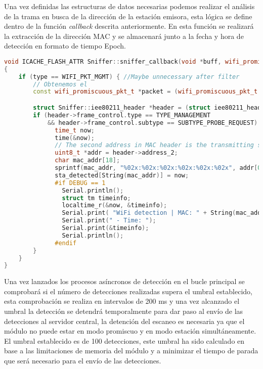 \documentclass[../proyecto.tex]{subfiles}
\begin{document}
Una vez definidas las estructuras de datos necesarias podemos realizar el análisis de la trama en busca de la dirección de la estación emisora, esta lógica se define dentro de la función \textit{callback} descrita anteriormente. En esta función se realizará la extracción de la dirección MAC y se almacenará junto a la fecha y hora de detección en formato de tiempo Epoch.\\

\begin{minipage}{\linewidth}
\begin{lstlisting}[language=C++, caption=Función \textit{callback} para el modo promiscuo , captionpos=b, frame=single]
void ICACHE_FLASH_ATTR Sniffer::sniffer_callback(void *buff, wifi_promiscuous_pkt_type_t type)
{
    if (type == WIFI_PKT_MGMT) { //Maybe unnecessary after filter
        // Obtenemos el
        const wifi_promiscuous_pkt_t *packet = (wifi_promiscuous_pkt_t *)buff;

        struct Sniffer::iee80211_header *header = (struct iee80211_header*) packet->payload;
        if (header->frame_control.type == TYPE_MANAGEMENT
            && header->frame_control.subtype == SUBTYPE_PROBE_REQUEST) {
              time_t now;
              time(&now);
              // The second address in MAC header is the transmitting station.
              uint8_t *addr = header->address_2;
              char mac_addr[18];
              sprintf(mac_addr, "%02x:%02x:%02x:%02x:%02x:%02x", addr[0], addr[1], addr[2], addr[3], addr[4], addr[5]);
              sta_detected[String(mac_addr)] = now;
              #if DEBUG == 1
                Serial.println();
                struct tm timeinfo;
                localtime_r(&now, &timeinfo);
                Serial.print( "WiFi detection | MAC: " + String(mac_addr) );
                Serial.print(" - Time: ");
                Serial.print(&timeinfo);
                Serial.println();
              #endif
        }
    }
}
\end{lstlisting}
\end{minipage}

Una vez lanzados los procesos asíncronos de detección en el bucle principal se comprobará si el número de detecciones realizadas supera el umbral establecido, esta comprobación se realiza en intervalos de 200 ms y una vez alcanzado el umbral la detección se detendrá temporalmente para dar paso al envío de las detecciones al servidor central, la detención del escaneo es necesaria ya que el módulo no puede estar en modo promiscuo y en modo estación simultáneamente. El umbral establecido es de 100 detecciones, este umbral ha sido calculado en base a las limitaciones de memoria del módulo y a minimizar el tiempo de parada que será necesario para el envío de las detecciones.\\
\end{document}

